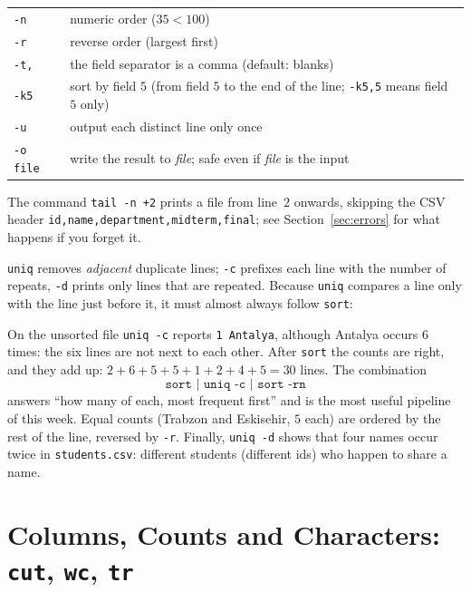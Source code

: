 \documentclass[11pt,a4paper]{article}
\newcommand{\cmd}[1]{\texttt{#1}}
\begin{document}
\begin{center}
\renewcommand{\arraystretch}{1.2}
\begin{tabular}{@{}lp{11.5cm}@{}}
\toprule
\cmd{-n} & numeric order ($35 < 100$)\\
\cmd{-r} & reverse order (largest first)\\
\cmd{-t,} & the field separator is a comma (default: blanks)\\
\cmd{-k5} & sort by field $5$ (from field $5$ to the end of the line; \cmd{-k5,5} means field $5$ only)\\
\cmd{-u} & output each distinct line only once\\
\cmd{-o file} & write the result to \emph{file}; safe even if \emph{file} is the input\\
\bottomrule
\end{tabular}
\end{center}

The command \cmd{tail -n +2} prints a file from line~$2$ onwards, skipping the CSV header \texttt{id,\allowbreak name,\allowbreak department,\allowbreak midterm,\allowbreak final}; see Section~\ref{sec:errors} for what happens if you forget it.

\cmd{uniq} removes \emph{adjacent} duplicate lines; \cmd{-c} prefixes each line with the number of repeats, \cmd{-d} prints only lines that are repeated. Because \cmd{uniq} compares a line only with the line just before it, it must almost always follow \cmd{sort}:



On the unsorted file \cmd{uniq -c} reports \texttt{1 Antalya}, although Antalya occurs $6$ times: the six lines are not next to each other. After \cmd{sort} the counts are right, and they add up: $2 + 6 + 5 + 5 + 1 + 2 + 4 + 5 = 30$ lines. The combination
\[
\texttt{sort | uniq -c | sort -rn}
\]
answers ``how many of each, most frequent first'' and is the most useful pipeline of this week. Equal counts (Trabzon and Eskisehir, $5$ each) are ordered by the rest of the line, reversed by \cmd{-r}. Finally, \cmd{uniq -d} shows that four names occur twice in \texttt{students.csv}: different students (different ids) who happen to share a name.

\section{Columns, Counts and Characters: \texttt{cut}, \texttt{wc}, \texttt{tr}}
\label{sec:cut}
\end{document}
